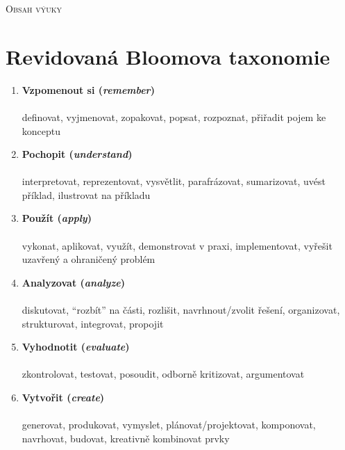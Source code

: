 \textsc{Obsah výuky}\\

\newpage

\chapter*{Revidovaná Bloomova taxonomie}
\label{bloom}
\vspace{-0.5em}
\vspace{-0.3em}

\begin{enumerate}[leftmargin=*]
\item \textbf{Vzpomenout si (\textit{remember})}\\
\\
{\small definovat, vyjmenovat, zopakovat, popsat, rozpoznat, přiřadit pojem ke konceptu}

\item \textbf{Pochopit (\textit{understand})}\\
\\
{\small interpretovat, reprezentovat, vysvětlit, parafrázovat, sumarizovat, uvést příklad, ilustrovat na příkladu}

\item \textbf{Použít (\textit{apply})}\\
\\
{\small vykonat, aplikovat, využít, demonstrovat v praxi, implementovat, vyřešit uzavřený a ohraničený problém}

\item \textbf{Analyzovat (\textit{analyze})}\\
\\
{\small diskutovat, \enquote{rozbít} na části, rozlišit, navrhnout/zvolit řešení, organizovat, strukturovat, integrovat, propojit}

\item \textbf{Vyhodnotit (\textit{evaluate})}\\
\\
{\small zkontrolovat, testovat, posoudit, odborně kritizovat, argumentovat}

\item \textbf{Vytvořit (\textit{create})}\\
\\
{\small generovat, produkovat, vymyslet, plánovat/projektovat, komponovat, navrhovat, budovat, kreativně kombinovat prvky}
\end{enumerate}


